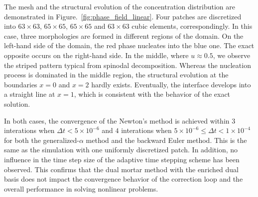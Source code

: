 The mesh and the structural evolution of the concentration distribution are demonstrated in Figure.~\ref{fig:phase_field_linear}. Four patches are discretized into $63 \times 63$, $65 \times 65$, $65 \times 65$ and $63 \times 63$ cubic elements, correspondingly. In this case, three morphologies are formed in different regions of the domain. On the left-hand side of the domain, the red phase nucleates into the blue one. The exact opposite occurs on the right-hand side. In the middle, where $u\approx 0.5$, we observe the striped pattern typical from spinodal decomposition. Whereas the nucleation process is dominated in the middle region, the structural evolution at the boundaries $x = 0$ and $x = 2$ hardly exists. Eventually, the interface develops into a straight line at $x = 1$, which is consistent with the behavior of the exact solution.\par

In both cases, the convergence of the Newton's method is achieved within $3$ interations when $\Delta t<5\times 10^{-6}$ and $4$ interations when $5\times 10^{-6} \leq \Delta t < 1\times 10^{-4}$ for both the generalized-$\alpha$ method and the backward Euler method. This is the same as the simulation with one uniformly discretized patch. In addition, no influence in the time step size of the adaptive time stepping scheme has been observed. This confirms that the dual mortar method with the enriched dual basis does not impact the convergence behavior of the correction loop and the overall performance in solving nonlinear problems.

